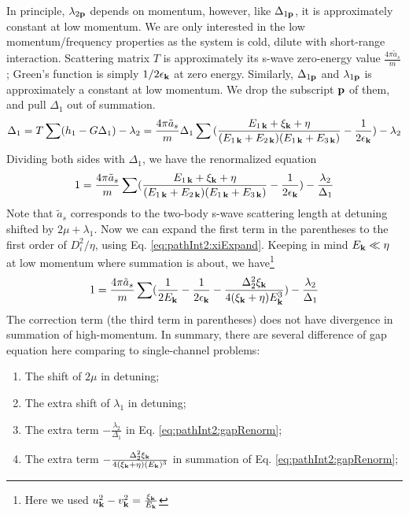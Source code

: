 In principle, $\lambda_{2\mathbf{p}}$ depends on momentum, however, like $\Delta_{1\mathbf{p}}$, it is approximately constant at low momentum.
We are only interested in the low momentum/frequency properties as the system is cold, dilute with short-range interaction. Scattering matrix $T$ is approximately its s-wave zero-energy value $\frac{4\pi{\tilde{a}_{s}}}{m}$; Green's function is simply $1/2\epsilon_{\mathbf{k}}$ at zero energy.   Similarly,   $\Delta_{1\mathbf{p}}$ and $\lambda_{1\mathbf{p}}$ is approximately a constant at low momentum.  We drop the subscript $\mathbf{p}$ of them, and pull $\Delta_{1}$ out of summation. 
\begin{equation}
\Delta_{1}=T\sum(h_{1}-G\Delta_{1})-\lambda_{2}
=\frac{4\pi{\tilde{a}_{s}}}{m}\Delta_{1}\sum{}(\frac{E_{1\,\mathbf{k}}+\xi_{\mathbf{k}}+\eta}{(E_{1\,\mathbf{k}}+E_{2\,\mathbf{k}})(E_{1\,\mathbf{k}}+E_{3\,\mathbf{k}})}-\frac{1}{2\epsilon_{\mathbf{k}}})
	-\lambda_{2}
\end{equation}
Dividing both sides with $\Delta_{1}$, we have the renormalized equation
\begin{equation}
1=\frac{4\pi{\tilde{a}_{s}}}{m}\sum(\frac{E_{1\,\mathbf{k}}+\xi_{\mathbf{k}}+\eta}{(E_{1\,\mathbf{k}}+E_{2\,\mathbf{k}})(E_{1\,\mathbf{k}}+E_{3\,\mathbf{k}})}-\frac{1}{2\epsilon_{\mathbf{k}}})
	-\frac{\lambda_{2}}{\Delta_{1}}
\end{equation}
Note that $\tilde{a}_{s}$ corresponds to the two-body s-wave scattering length at detuning shifted by $2\mu+\lambda_{1}$.
Now we can expand the first term in the parentheses to the first order of $D_{i}^{2}/\eta$, using Eq. \ref{eq:pathInt2:xiExpand}. Keeping in mind $E_{\mathbf{k}}\ll{\eta}$ at low momentum where summation is about, we have\footnote{Here we used $u_{\mathbf{k}}^{2}-v_{\mathbf{k}}^{2}=\frac{\xi_{\mathbf{k}}}{E_{\mathbf{k}}}$}
\begin{equation}\label{eq:pathInt2:gapRenorm}
1=\frac{4\pi{\tilde{a}_{s}}}{m}\sum(\frac{1}{2E_{\mathbf{k}}}-\frac{1}{2\epsilon_{\mathbf{k}}}-\frac{\Delta_{2}^{2}\xi_{\mathbf{k}}}{4(\xi_{\mathbf{k}}+\eta){E_{\mathbf{k}}^{3}}})
	-\frac{\lambda_{2}}{\Delta_{1}}
\end{equation}
The correction term (the third term in parentheses) does not have divergence in summation of high-momentum. 
In summary, there are several difference of gap equation here comparing to single-channel problems:
\begin{enumerate}
\item\label{item:pathInt2:mu}The shift of $2\mu$ in detuning;
\item The extra shift of $\lambda_{1}$ in detuning;
\item The extra term $-\frac{\lambda_{2}}{\Delta_{1}}$ in Eq. \ref{eq:pathInt2:gapRenorm};
\item The extra term $-\frac{\Delta_{2}^{2}\xi_{\mathbf{k}}}{4(\xi_{\mathbf{k}}+\eta){(E_{\mathbf{k}})^{3}}}$ in summation of Eq. \ref{eq:pathInt2:gapRenorm};
\end{enumerate}
